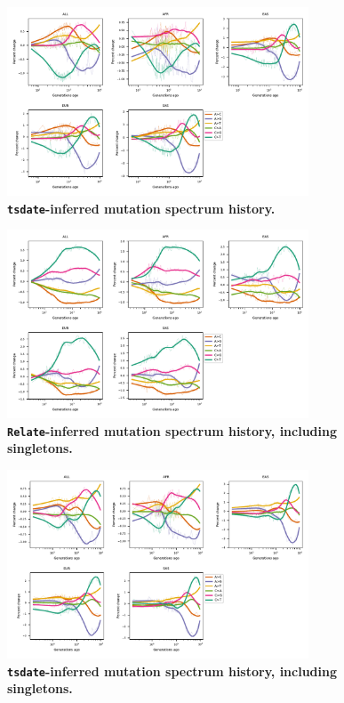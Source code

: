 \documentclass[]{article}
\begin{document}
\begin{figure}[ht!]
    \centering
    \includegraphics[width=0.8\textwidth]{../plots/spectrum_history.tsdate.max_age.10000.pdf}
    \caption{
        \textbf{\texttt{tsdate}-inferred mutation spectrum history.}
    }
    \label{fig:tsdate-spectra}
\end{figure}


\begin{figure}[ht!]
    \centering
    \includegraphics[width=0.8\textwidth]{../plots/spectrum_history.relate.max_age.10000.singletons.pdf}
    \caption{
        \textbf{\texttt{Relate}-inferred mutation spectrum history, including singletons.}
    }
    \label{fig:relate-spectra}
\end{figure}


\begin{figure}[ht!]
    \centering
    \includegraphics[width=0.8\textwidth]{../plots/spectrum_history.tsdate.max_age.10000.singletons.pdf}
    \caption{
        \textbf{\texttt{tsdate}-inferred mutation spectrum history, including singletons.}
    }
    \label{fig:tsdate-spectra}
\end{figure}
\end{document}
